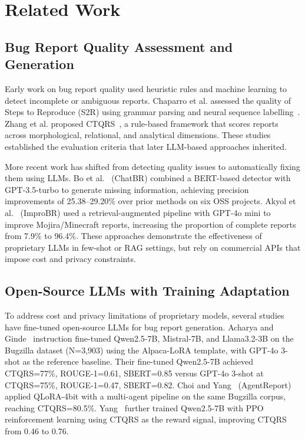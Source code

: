 
\section{Related Work}
\label{sec:related}

\subsection{Bug Report Quality Assessment and Generation}

Early work on bug report quality used heuristic rules and
machine learning to detect incomplete or ambiguous reports.
Chaparro et al. assessed the quality of Steps to Reproduce
(S2R) using grammar parsing and neural sequence
labelling~\cite{chaparro2019assessing}. Zhang et al.
proposed CTQRS~\cite{zhang2022ctqrs}, a rule-based framework
that scores reports across morphological, relational, and
analytical dimensions. These studies established the
evaluation criteria that later LLM-based approaches inherited.

More recent work has shifted from detecting quality issues to
automatically fixing them using LLMs. Bo et al.~\cite{bo2024chatbr}
(ChatBR) combined a BERT-based detector with GPT-3.5-turbo to
generate missing information, achieving precision improvements
of 25.38--29.20\% over prior methods on six OSS projects.
Akyol et al.~\cite{akyol2026improbr} (ImproBR) used a
retrieval-augmented pipeline with GPT-4o mini to improve
Mojira/Minecraft reports, increasing the proportion of
complete reports from 7.9\% to 96.4\%. These approaches
demonstrate the effectiveness of proprietary LLMs in
few-shot or RAG settings, but rely on commercial APIs
that impose cost and privacy constraints.

\subsection{Open-Source LLMs with Training Adaptation}

To address cost and privacy limitations of proprietary
models, several studies have fine-tuned open-source LLMs
for bug report generation.
Acharya and Ginde~\cite{acharya2025bugquality} instruction
fine-tuned Qwen2.5-7B, Mistral-7B, and Llama3.2-3B on the
Bugzilla dataset (N=3,903) using the Alpaca-LoRA template,
with GPT-4o 3-shot as the reference baseline. Their
fine-tuned Qwen2.5-7B achieved CTQRS=77\%, ROUGE-1=0.61,
SBERT=0.85 versus GPT-4o 3-shot at CTQRS=75\%,
ROUGE-1=0.47, SBERT=0.82.
Choi and Yang~\cite{choi2025agentreport} (AgentReport)
applied QLoRA-4bit with a multi-agent pipeline on the same
Bugzilla corpus, reaching CTQRS=80.5\%.
Yang~\cite{yang2025ctqrsrl} further trained Qwen2.5-7B with
PPO reinforcement learning using CTQRS as the reward signal,
improving CTQRS from 0.46 to 0.76.

